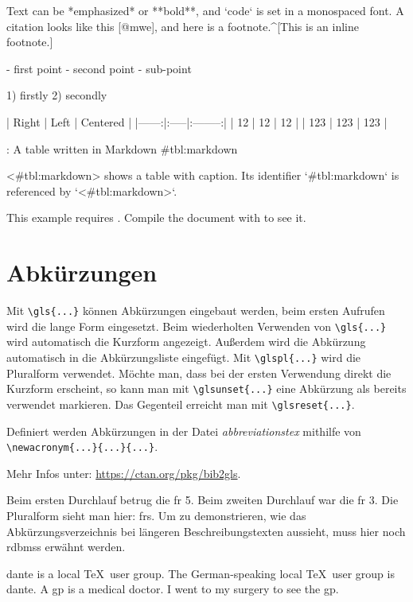   \begin{ltgexample}
  \begin{markdown}
Text can be *emphasized* or **bold**, and `code` is set in a monospaced font.
A citation looks like this [@mwe], and here is a footnote.^[This is an inline footnote.]

- first point
- second point
  - sub-point

1) firstly
2) secondly

| Right | Left | Centered |
|------:|:-----|:--------:|
|    12 | 12   |    12    |
|   123 | 123  |   123    |

: A table written in Markdown {#tbl:markdown}

<#tbl:markdown> shows a table with caption.
Its identifier `{#tbl:markdown}` is referenced by `<#tbl:markdown>`.
\end{markdown}
  \end{ltgexample}
\else
  This example requires .
  Compile the document with  to see it.
\fi

\section{Abkürzungen}

Mit \verb+\gls{...}+ können Abkürzungen eingebaut werden, beim ersten Aufrufen wird die lange Form eingesetzt.
Beim wiederholten Verwenden von \verb+\gls{...}+ wird automatisch die Kurzform angezeigt.
Außerdem wird die Abkürzung automatisch in die Abkürzungsliste eingefügt.
Mit \verb+\glspl{...}+ wird die Pluralform verwendet.
Möchte man, dass bei der ersten Verwendung direkt die Kurzform erscheint, so kann man mit \verb+\glsunset{...}+ eine Abkürzung als bereits verwendet markieren.
Das Gegenteil erreicht man mit \verb+\glsreset{...}+.

Definiert werden Abkürzungen in der Datei \textit{abbreviationstex} mithilfe von \verb+\newacronym{...}{...}{...}+.

Mehr Infos unter: \url{https://ctan.org/pkg/bib2gls}.

\begin{ltgexample}
Beim ersten Durchlauf betrug die \gls{fr} 5.
Beim zweiten Durchlauf war die \gls{fr} 3.
Die Pluralform sieht man hier: \glspl{fr}.
Um zu demonstrieren, wie das Abkürzungsverzeichnis bei längeren Beschreibungstexten aussieht, muss hier noch \glspl{rdbms} erwähnt werden.

\gls{dante} is a local \TeX\ user group.
The German-speaking local \TeX\ user group is \gls{dante}.
A \gls{gp} is a medical doctor.
I went to my surgery to see the \gls{gp}.
\end{ltgexample}

